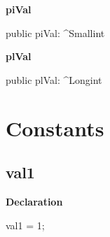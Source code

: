 \documentclass{report}
\newif\ifpdf
\begin{document}
\begin{list}{}
\par  \label{WeirdRecord.TWeirdRecord-piVal}
\item[\textbf{piVal}\hfill]
\ifpdf
\begin{flushleft}
\fi
\begin{ttfamily}
public piVal: {\^{}}Smallint\end{ttfamily}

\ifpdf
\end{flushleft}
\fi


\par  \label{WeirdRecord.TWeirdRecord-plVal}
\item[\textbf{plVal}\hfill]
\ifpdf
\begin{flushleft}
\fi
\begin{ttfamily}
public plVal: {\^{}}Longint\end{ttfamily}

\ifpdf
\end{flushleft}
\fi


\par  \end{list}
\section{Constants}
\ifpdf
\subsection*{\large{\textbf{val1}}\normalsize\hspace{1ex}\hrulefill}
\else
\subsection*{val1}
\fi
\label{WeirdRecord-val1}
\begin{list}{}{
\setlength{\itemindent}{0cm}
\setlength{\listparindent}{0cm}
\setlength{\leftmargin}{\evensidemargin}
\addtolength{\leftmargin}{\tmplength}
\settowidth{\labelsep}{X}
\addtolength{\leftmargin}{\labelsep}
\setlength{\labelwidth}{\tmplength}
}
\item[\textbf{Declaration}\hfill]
\ifpdf
\begin{flushleft}
\fi
\begin{ttfamily}
val1 = 1;\end{ttfamily}

\ifpdf
\end{flushleft}
\fi

\end{list}
\ifpdf
\end{document}
